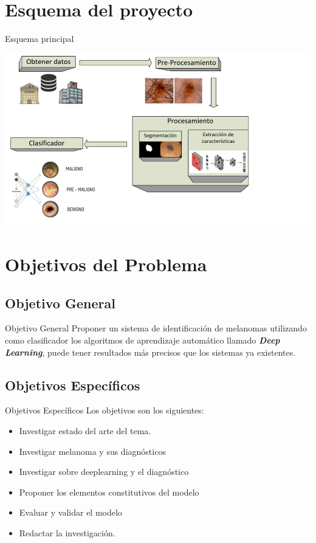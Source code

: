 \documentclass{beamer}
\begin{document}
\section{Esquema del proyecto}

\begin{frame}{Esquema principal}

	\includegraphics[scale=0.6]{esquema_v01}

\end{frame} 

%
\section{Objetivos del Problema}

\subsection{Objetivo General}

\begin{frame}{Objetivo General}
Proponer un sistema de identificación de melanomas utilizando como clasificador los algoritmos de aprendizaje automático llamado \textbf{\textit{Deep Learning}}, puede tener resultados más precisos que los sistemas ya existentes.
\end{frame}

\subsection{Objetivos Específicos}

\begin{frame}{Objetivos Específicos}
Los objetivos son los siguientes:
\begin{itemize}
	\item Investigar estado del arte del tema.
	\item Investigar melanoma y sus diagnósticos
	\item Investigar sobre deeplearning y el diagnóstico
	\item Proponer los elementos constitutivos del modelo
	\item Evaluar y validar el modelo
	\item Redactar la investigación.
	
\end{itemize}
\end{frame}
\end{document}
